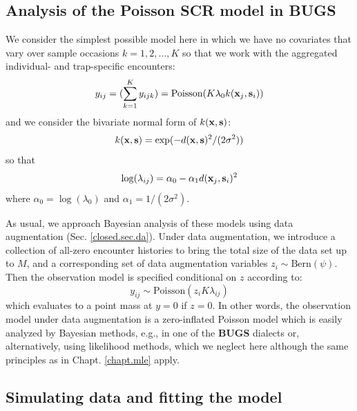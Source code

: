 \subsection{Analysis of the Poisson SCR model in BUGS}

We consider the simplest possible model here in which we have no
covariates that vary over sample occasions  $k=1,2,\ldots,K$
so that we work with
the aggregated individual- and trap-specific encounters:
\[
y_{ij} = (\sum_{k=1}^{K} y_{ijk}) =  \mbox{Poisson}(K  \lambda_{0}
k({\bf x}_{j},{\bf s}_{i}) )
\]
and we consider the bivariate normal form of $k({\bf x},{\bf s})$:
\[
k({\bf x},{\bf s}) = \exp( -d({\bf x}, {\bf
  s})^{2} /(2\sigma^{2}))
\]
so that
\[
\log( \lambda_{ij})  =\alpha_{0} - \alpha_{1} d({\bf x}_{j}, {\bf s}_{i})^2
\]
where $\alpha_{0} = \log(\lambda_{0})$ and $\alpha_1 = 1/(2\sigma^2)$.


As usual, we approach Bayesian analysis of these models using data
augmentation (Sec. \ref{closed.sec.da}).  Under data augmentation, we
introduce a collection of all-zero encounter histories to bring the
total size of the data set up to $M$, and a corresponding set of data
augmentation variables $z_{i} \sim \mbox{Bern}(\psi)$. Then the
observation model is specified conditional on $z$ according to:
\[
y_{ij} \sim  \mbox{Poisson}(z_{i} K  \lambda_{ij})
\]
which evaluates to a point mass at $y=0$ if $z=0$.  In other words,
the observation model under data augmentation is a zero-inflated
Poisson model which is easily analyzed by Bayesian methods, e.g., in
one of the {\bf BUGS} dialects or, alternatively, using likelihood
methods, which we neglect here although the same principles as in
Chapt. \ref{chapt.mle} apply.


\subsection{Simulating data and fitting the model}


